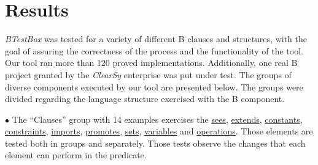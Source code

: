\documentclass[runningheads]{llncs}
\begin{document}
\section{Results} \label{sec:Results}


\textit{BTestBox} was tested for a variety of different B clauses and structures, with the goal of assuring the correctness of the process and the functionality of the tool. Our tool ran more than 120 proved implementations. Additionally, one real B project granted by the \textit{ClearSy} enterprise was put under test. The groups of diverse components executed by our tool are presented below. The groups were divided regarding the language structure exercised with the B component.

    $\bullet$ The ``Clauses'' group with 14 examples exercises the \underline{sees}, \underline{extends}, \underline{constants}, \underline{constraints}, \underline{imports}, \underline{promotes}, \underline{sets}, \underline{variables} and \underline{operations}. Those elements are tested both in groups and separately. Those tests observe the changes that each element can perform in the predicate.
    
\end{document}
